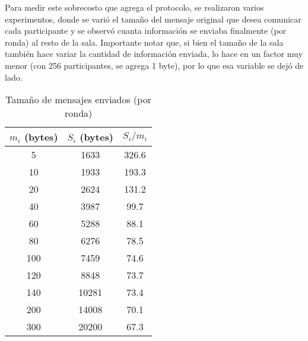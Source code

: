 Para medir este sobrecosto que agrega el protocolo, se realizaron varios experimentos, donde se varió el tamaño del mensaje original que desea comunicar cada participante y se observó cuanta información se enviaba finalmente (por ronda) al resto de la sala. Importante notar que, si bien el tamaño de la sala también hace variar la cantidad de información enviada, lo hace en un factor muy menor (con 256 participantes, se agrega 1 byte), por lo que esa variable se dejó de lado.

\begin{table}[h]
\centering
\label{my-label}
\begin{tabular}{|c|c|c|}
\hline
$m_i$ (bytes) & $S_i$ (bytes) & $S_i / m_i$ \\ \hline
5                                   & 1633                               & 326.6       \\ \hline
10                                  & 1933                               & 193.3       \\ \hline
20                                  & 2624                               & 131.2       \\ \hline
40                                  & 3987                               & 99.7        \\ \hline
60                                  & 5288                               & 88.1        \\ \hline
80                                  & 6276                               & 78.5        \\ \hline
100                                 & 7459                               & 74.6        \\ \hline
120                                 & 8848                               & 73.7        \\ \hline
140                                 & 10281                              & 73.4        \\ \hline
200                                 & 14008                              & 70.1        \\ \hline
300                                 & 20200                              & 67.3        \\ \hline
\end{tabular}
\caption{Tamaño de mensajes enviados (por ronda)}
\end{table}


